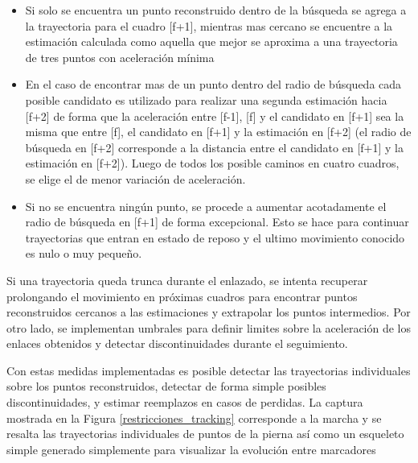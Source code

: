 \begin{itemize}

\item Si solo se encuentra un punto reconstruido dentro de la búsqueda se agrega a la trayectoria para el cuadro [f+1], mientras mas cercano se encuentre a la estimación calculada como aquella que mejor se aproxima a una trayectoria de tres puntos con aceleración mínima

\item En el caso de encontrar mas de un punto dentro del radio de búsqueda cada posible candidato es utilizado para realizar una segunda estimación hacia [f+2] de forma que la aceleración entre [f-1], [f] y el candidato en [f+1] sea la misma que entre [f], el candidato en [f+1] y la estimación en [f+2] (el radio de búsqueda en [f+2] corresponde a la distancia entre el candidato en [f+1] y la estimación en [f+2]). Luego de todos los posible caminos en cuatro cuadros, se elige el de menor variación de aceleración.

\item Si no se encuentra ningún punto, se procede a aumentar acotadamente el radio de búsqueda en [f+1] de forma excepcional. Esto se hace para continuar trayectorias que entran en estado de reposo y el ultimo movimiento conocido es nulo o muy pequeño.

\end{itemize}

Si una trayectoria queda trunca durante el enlazado, se intenta recuperar prolongando el movimiento en próximas cuadros para encontrar puntos reconstruidos cercanos a las estimaciones y extrapolar los puntos intermedios. Por otro lado, se implementan umbrales para definir limites sobre la aceleración de los enlaces obtenidos y detectar discontinuidades durante el seguimiento.

Con estas medidas implementadas es posible detectar las trayectorias individuales sobre los puntos reconstruidos, detectar de forma simple posibles discontinuidades, y estimar reemplazos en casos de perdidas. La captura mostrada en la Figura \ref{restricciones_tracking} corresponde a la marcha y se resalta las trayectorias individuales de puntos de la pierna así como un esqueleto simple generado simplemente para visualizar la evolución entre marcadores

